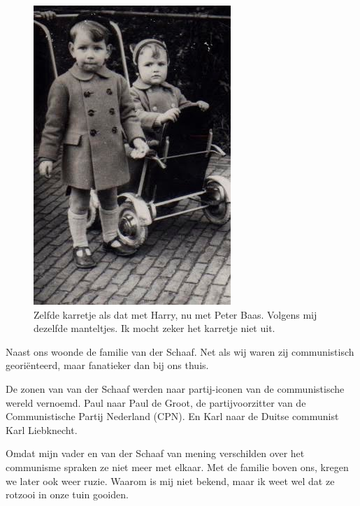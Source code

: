 \documentclass[10pt,twoside, openright]{memoir}
\begin{document}
\begin{figure}
\includegraphics[width=\textwidth]{img/ch5/peterme}
\caption*{\footnotesize Zelfde karretje als dat met Harry, nu met Peter Baas. Volgens mij dezelfde manteltjes. Ik mocht zeker het karretje niet uit.}
\end{figure}

Naast ons woonde de familie van der Schaaf. Net als wij waren zij communistisch georiënteerd, maar fanatieker dan bij ons thuis. 

De zonen van van der Schaaf werden naar partij-iconen van de communistische wereld vernoemd. Paul naar Paul de Groot, de partijvoorzitter van de Communistische Partij Nederland (CPN). En Karl naar de Duitse communist Karl Liebknecht. 

Omdat mijn vader en van der Schaaf van mening verschilden over het communisme spraken ze niet meer met elkaar. Met de familie boven ons, kregen we later ook weer ruzie. Waarom is mij niet bekend, maar ik weet wel dat ze rotzooi in onze tuin gooiden. 
\end{document}
